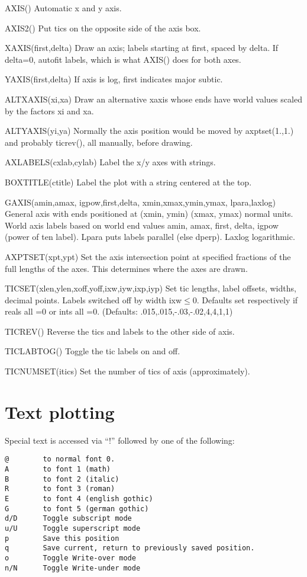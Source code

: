 \documentclass[12pt]{article}
\newif \iftth
\begin{document}
AXIS() Automatic x and y axis.

AXIS2() Put tics on the opposite side of the axis box.

XAXIS(first,delta) Draw an axis; labels starting at first, spaced by delta.
If delta=0, autofit labels, which is what AXIS() does for both axes.

YAXIS(first,delta) If axis is log, first indicates major subtic.

ALTXAXIS(xi,xa) Draw an alternative xaxis whose ends have world values
scaled by the factors xi and xa.

ALTYAXIS(yi,ya) Normally the axis position would be moved by
axptset(1.,1.) and probably ticrev(), all manually, before drawing.

AXLABELS(cxlab,cylab) Label the x/y axes with strings.

BOXTITLE(ctitle) Label the plot with a string centered at the top.

GAXIS(amin,amax, igpow,first,delta, xmin,xmax,ymin,ymax, lpara,laxlog)
General axis with ends positioned at (xmin, ymin) (xmax, ymax) normal
units. World axis labels based on world end values amin, amax, first, delta,
igpow (power of ten label).  Lpara puts labels parallel (else
dperp). Laxlog logarithmic.

AXPTSET(xpt,ypt) Set the axis intersection point at specified fractions of
the full lengths of the axes. This determines where the axes are drawn.

TICSET(xlen,ylen,xoff,yoff,ixw,iyw,ixp,iyp) Set tic lengths, label
offsets, widths, decimal points. Labels switched off by width
ixw$\le$0. Defaults set respectively if reals all =0 or ints all
=0. (Defaults: .015,.015,-.03,-.02,4,4,1,1)

TICREV() Reverse the tics and labels to the other side of axis.

TICLABTOG() Toggle the tic labels on and off.

TICNUMSET(itics) Set the number of tics of axis (approximately).

\section{Text plotting}

\iftth \special{html:<img align="right" src="fontshow.png">} \fi

Special text is accessed via ``!'' followed by one of 
the following:
\begin{verbatim}
@        to normal font 0.
A        to font 1 (math)
B        to font 2 (italic)
R        to font 3 (roman)
E        to font 4 (english gothic)
G        to font 5 (german gothic)
d/D      Toggle subscript mode
u/U      Toggle superscript mode
p        Save this position
q        Save current, return to previously saved position.
o        Toggle Write-over mode
n/N      Toggle Write-under mode
\end{verbatim}
\end{document}
